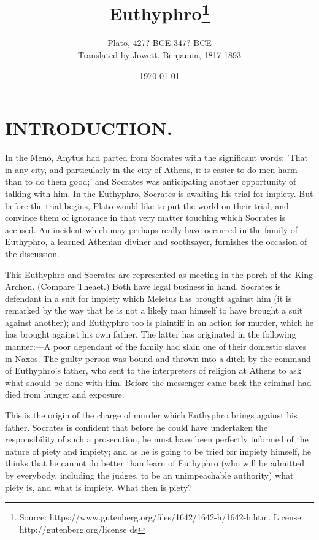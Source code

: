 \documentclass[11pt,letter]{article}
\begin{document}
\title{Euthyphro\thanks{Source: https://www.gutenberg.org/files/1642/1642-h/1642-h.htm. License: http://gutenberg.org/license ds}}
\date{\today}
\author{Plato, 427? BCE-347? BCE\\ Translated by Jowett, Benjamin, 1817-1893}
\maketitle

\setcounter{tocdepth}{1}
\tableofcontents
\renewcommand{\baselinestretch}{1.0}
\normalsize
\newpage

\section{
      INTRODUCTION.
    }
\par  In the Meno, Anytus had parted from Socrates with the significant words: 'That in any city, and particularly in the city of Athens, it is easier to do men harm than to do them good;' and Socrates was anticipating another opportunity of talking with him. In the Euthyphro, Socrates is awaiting his trial for impiety. But before the trial begins, Plato would like to put the world on their trial, and convince them of ignorance in that very matter touching which Socrates is accused. An incident which may perhaps really have occurred in the family of Euthyphro, a learned Athenian diviner and soothsayer, furnishes the occasion of the discussion.

\par  This Euthyphro and Socrates are represented as meeting in the porch of the King Archon. (Compare Theaet.) Both have legal business in hand. Socrates is defendant in a suit for impiety which Meletus has brought against him (it is remarked by the way that he is not a likely man himself to have brought a suit against another); and Euthyphro too is plaintiff in an action for murder, which he has brought against his own father. The latter has originated in the following manner:—A poor dependant of the family had slain one of their domestic slaves in Naxos. The guilty person was bound and thrown into a ditch by the command of Euthyphro's father, who sent to the interpreters of religion at Athens to ask what should be done with him. Before the messenger came back the criminal had died from hunger and exposure.

\par  This is the origin of the charge of murder which Euthyphro brings against his father. Socrates is confident that before he could have undertaken the responsibility of such a prosecution, he must have been perfectly informed of the nature of piety and impiety; and as he is going to be tried for impiety himself, he thinks that he cannot do better than learn of Euthyphro (who will be admitted by everybody, including the judges, to be an unimpeachable authority) what piety is, and what is impiety. What then is piety?
\end{document}
